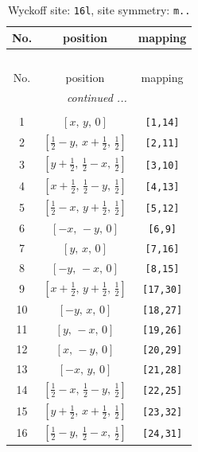 \documentclass[fleqn,8pt]{jsarticle}
\begin{document}
\renewcommand{\arraystretch}{1.2}
\begin{longtable}{ccc}
\caption{Wyckoff site: {\tt 16l}, site symmetry: {\tt m..}}
 \\
 \hline \hline
No. & position & mapping \\ \hline \endfirsthead

\multicolumn{2}{l}{\tablename\ \thetable{}} \\
 \hline \hline
No. & position & mapping \\ \hline \endhead

 \hline \hline
\multicolumn{2}{r}{\footnotesize\it continued ...} \\ \endfoot

 \hline \hline
\multicolumn{2}{r}{} \\ \endlastfoot

1 & $\left[ x,\, y,\, 0 \right]$ & {\tt [1,14]} \\ \hline
2 & $\left[ \frac{1}{2} - y,\, x + \frac{1}{2},\, \frac{1}{2} \right]$ & {\tt [2,11]} \\ \hline
3 & $\left[ y + \frac{1}{2},\, \frac{1}{2} - x,\, \frac{1}{2} \right]$ & {\tt [3,10]} \\ \hline
4 & $\left[ x + \frac{1}{2},\, \frac{1}{2} - y,\, \frac{1}{2} \right]$ & {\tt [4,13]} \\ \hline
5 & $\left[ \frac{1}{2} - x,\, y + \frac{1}{2},\, \frac{1}{2} \right]$ & {\tt [5,12]} \\ \hline
6 & $\left[ - x,\, - y,\, 0 \right]$ & {\tt [6,9]} \\ \hline
7 & $\left[ y,\, x,\, 0 \right]$ & {\tt [7,16]} \\ \hline
8 & $\left[ - y,\, - x,\, 0 \right]$ & {\tt [8,15]} \\ \hline
9 & $\left[ x + \frac{1}{2},\, y + \frac{1}{2},\, \frac{1}{2} \right]$ & {\tt [17,30]} \\ \hline
10 & $\left[ - y,\, x,\, 0 \right]$ & {\tt [18,27]} \\ \hline
11 & $\left[ y,\, - x,\, 0 \right]$ & {\tt [19,26]} \\ \hline
12 & $\left[ x,\, - y,\, 0 \right]$ & {\tt [20,29]} \\ \hline
13 & $\left[ - x,\, y,\, 0 \right]$ & {\tt [21,28]} \\ \hline
14 & $\left[ \frac{1}{2} - x,\, \frac{1}{2} - y,\, \frac{1}{2} \right]$ & {\tt [22,25]} \\ \hline
15 & $\left[ y + \frac{1}{2},\, x + \frac{1}{2},\, \frac{1}{2} \right]$ & {\tt [23,32]} \\ \hline
16 & $\left[ \frac{1}{2} - y,\, \frac{1}{2} - x,\, \frac{1}{2} \right]$ & {\tt [24,31]} \\
\end{longtable}
\end{document}
